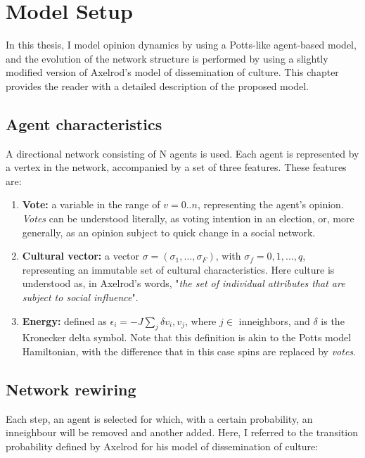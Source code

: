 \documentclass[12pt,openright,twoside]{book}
\begin{document}
\chapter{Model Setup}

In this thesis, I model opinion dynamics by using a Potts-like agent-based model, and the evolution of the network structure is performed by using a slightly modified version of Axelrod's model of dissemination of culture. This chapter provides the reader with a detailed description of the proposed model.\\

\section{Agent characteristics}

A directional network consisting of N agents is used. Each agent is represented by a vertex in the network, accompanied by a set of three features. These features are:\\

\begin{enumerate}
  \item \textbf{Vote:} a variable in the range of $v=0..n$, representing the agent's opinion. \textit{Votes} can be understood literally, as voting intention in an election, or, more generally, as an opinion subject to quick change in a social network.
  \item \textbf{Cultural vector:} a vector $\sigma=(\sigma_1,...,\sigma_F)$, with $\sigma_f=0,1,...,q$, representing an immutable set of cultural characteristics. Here culture is understood as, in Axelrod's words, "\textit{the set of individual attributes that are subject to social influence}".
  \item \textbf{Energy:} defined as $\epsilon_{i}=-J\sum_{j}\delta{v_i,v_j}$, where $j\in$ inneighbors, and $\delta$ is the Kronecker delta symbol. Note that this definition is akin to the Potts model Hamiltonian, with the difference that in this case spins are replaced by \textit{votes}.
\end{enumerate}

\vspace{14pt}

\section{Network rewiring}

Each step, an agent is selected for which, with a certain probability, an inneighbour will be removed and another added. Here, I referred to the transition probability defined by Axelrod for his model of dissemination of culture:\\
\end{document}
